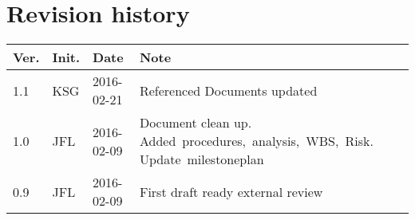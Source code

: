 \chapter*{Revision history}
\label{app:rev_his}


\begin{tabular}{b{1cm} b{1cm} b{2cm} b{8cm}}
    \textbf{Ver.} & \textbf{Init.} & \textbf{Date} & \textbf{Note} \\
    \hline
    1.1 & KSG & 2016-02-21 & Referenced Documents updated \\
    1.0 & JFL & 2016-02-09 & Document clean up. Added~procedures,~analysis,~WBS,~Risk. Update~milestoneplan \\
    0.9 & JFL & 2016-02-09 & First draft ready external review \\
\end{tabular}
